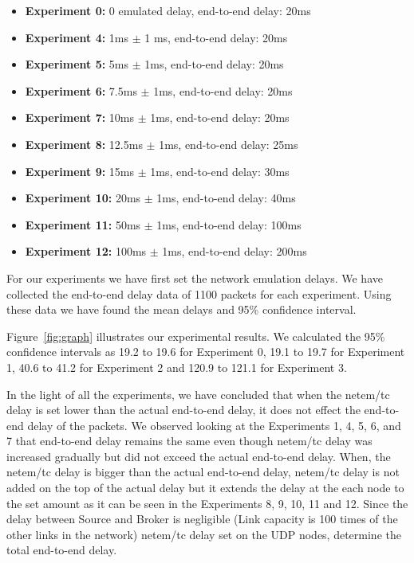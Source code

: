\documentclass[conference]{IEEEtran}
\begin{document}
\begin{itemize}
    \item \textbf{Experiment 0:} 0 emulated delay, end-to-end delay: 20ms
    \item \textbf{Experiment 4:} 1ms $\pm$ 1 ms, end-to-end delay: 20ms
    \item \textbf{Experiment 5:} 5ms $\pm$ 1ms, end-to-end delay: 20ms
    \item \textbf{Experiment 6:} 7.5ms $\pm$ 1ms, end-to-end delay: 20ms
    \item \textbf{Experiment 7:} 10ms $\pm$ 1ms, end-to-end delay: 20ms
    \item \textbf{Experiment 8:} 12.5ms $\pm$ 1ms, end-to-end delay: 25ms
    \item \textbf{Experiment 9:} 15ms $\pm$ 1ms, end-to-end delay: 30ms
    \item \textbf{Experiment 10:} 20ms $\pm$ 1ms, end-to-end delay: 40ms
    \item \textbf{Experiment 11:} 50ms $\pm$ 1ms, end-to-end delay: 100ms
    \item \textbf{Experiment 12:} 100ms $\pm$ 1ms, end-to-end delay: 200ms
\end{itemize}

For our experiments we have first set the network emulation delays. We have collected the end-to-end delay data of 1100 packets for each experiment. Using these data we have found the mean delays and 95\% confidence interval.

Figure~\ref{fig:graph} illustrates our experimental results.
We calculated the 95\% confidence intervals as 19.2 to 19.6 for Experiment 0,
19.1 to 19.7 for Experiment 1, 40.6 to 41.2 for Experiment 2 and 120.9 to 121.1
for Experiment 3.

In the light of all the experiments, we have concluded that when the netem/tc delay is set lower than the actual end-to-end delay, it does not effect the end-to-end delay of the packets. We observed looking at the Experiments 1, 4, 5, 6, and 7 that end-to-end delay remains the same even though netem/tc delay was increased gradually but did not exceed the actual end-to-end delay. When, the netem/tc delay is bigger than the actual end-to-end delay, netem/tc delay is not added on the top of the actual delay but it extends the delay at the each node to the set amount as it can be seen in the Experiments 8, 9, 10, 11 and 12. Since the delay between Source and Broker is negligible (Link capacity is 100 times of the other links in the network) netem/tc delay set on the UDP nodes, determine the total end-to-end delay.
\end{document}
